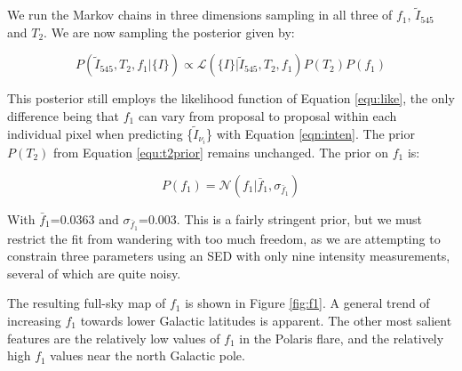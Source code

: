 \documentclass{emulateapj}
\begin{document}

We run the Markov chains in three dimensions sampling in all three of $f_1$,
$\tilde{I}_{545}$ and $T_2$. We are now sampling the posterior given by:

\begin{equation}
\label{eqn:f1post}
P(\tilde{I}_{545}, T_2, f_1|\{I\}) \propto \mathcal{L}(\{I\}|\tilde{I}_{545}, T_2, f_1)P(T_2)P(f_1)
\end{equation}

This posterior still employs the likelihood function of Equation 
\ref{equ:like}, the only difference being that $f_1$ can vary from proposal to 
proposal within each individual pixel when predicting \{$\tilde{I}_{\nu_i}$\} 
with Equation \ref{eqn:inten}. The prior $P(T_2)$ from Equation 
\ref{equ:t2prior} remains unchanged. The prior on $f_1$ is:

\begin{equation} \label{equ:f1prior}
P(f_1) = \mathcal{N}(f_1|\bar{f}_1, \sigma_{\bar{f}_1})
\end{equation}

With $\bar{f}_1$=0.0363 and $\sigma_{\bar{f}_1}$=0.003. This is a fairly
stringent prior, but we must restrict the fit from wandering with too much
freedom, as we are attempting to constrain three parameters using an SED
with only nine intensity measurements, several of which are quite noisy. 



The resulting full-sky map of $f_1$ is shown in Figure \ref{fig:f1}. A 
general trend of increasing $f_1$ towards lower Galactic latitudes is 
apparent. The other most salient features are the relatively low
values of $f_1$ in the Polaris flare, and the relatively high $f_1$ values
near the north Galactic pole.

 
\end{document}
